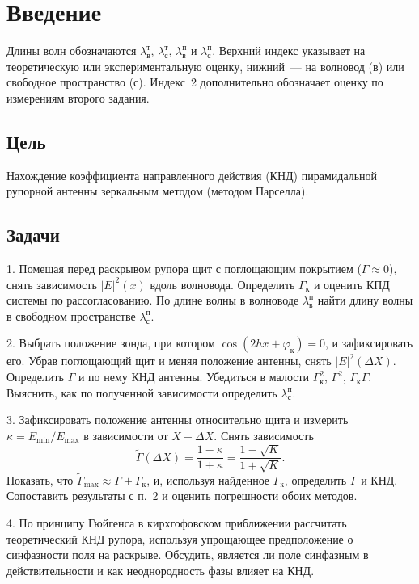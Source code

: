 \section{Введение}

Длины волн обозначаются $\lambda^{\text{т}}_{\text{в}}$, $\lambda^{\text{т}}_{\text{с}}$, $\lambda^{\text{п}}_{\text{в}}$ и $\lambda^{\text{п}}_{\text{с}}$. Верхний индекс указывает на теоретическую или экспериментальную оценку, нижний~--- на волновод (в) или свободное пространство (с). Индекс~2 дополнительно обозначает оценку по измерениям второго задания.
\subsection*{Цель} 

Нахождение коэффициента направленного действия (КНД) пирамидальной рупорной антенны зеркальным методом (методом Парселла).

\subsection*{Задачи} 

1. Помещая перед раскрывом рупора щит с поглощающим покрытием ($\Gamma \approx 0$), снять зависимость $|E|^2(x)$ вдоль волновода. Определить $\Gamma_{\text{к}}$ и оценить КПД системы по рассогласованию. По длине волны в волноводе ${\lambda^{\text{п}}_{\text{в}}}$ найти длину волны в свободном пространстве ${\lambda^{\text{п}}_{\text{с}}}$.

2. Выбрать положение зонда, при котором $\cos(2hx + \varphi_{\text{к}}) = 0$, и зафиксировать его. Убрав поглощающий щит и меняя положение антенны, снять $|E|^2(\Delta X)$. Определить $\Gamma$ и по нему КНД антенны. Убедиться в малости $\Gamma_{\text{к}}^2$, $\Gamma^2$, $\Gamma_{\text{к}}\Gamma$. Выяснить, как по полученной зависимости определить ${\lambda^{\text{п}}_{\text{с}}}$.

3. Зафиксировать положение антенны относительно щита и измерить $\kappa = E_{\min}/E_{\max}$ в зависимости от $X + \Delta X$. Снять зависимость
\[
\tilde{\Gamma}(\Delta X) = \frac{1 - \kappa}{1 + \kappa} = \frac{1 - \sqrt{K}}{1 + \sqrt{K}}.
\]
Показать, что $\tilde{\Gamma}_{\max} \approx \Gamma + \Gamma_{\text{к}}$, и, используя найденное $\Gamma_{\text{к}}$, определить $\Gamma$ и КНД. Сопоставить результаты с п.~2 и оценить погрешности обоих методов.

4. По принципу Гюйгенса в кирхгофовском приближении рассчитать теоретический КНД рупора, используя упрощающее предположение о синфазности поля на раскрыве. Обсудить, является ли поле синфазным в действительности и как неоднородность фазы влияет на КНД.

